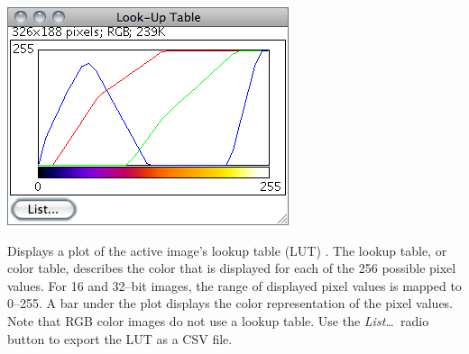 \begin{minipage}[c][1\totalheight][t]{0.438\columnwidth}%
\includegraphics[scale=0.55]{images/ShowLut}%
\end{minipage}%
\begin{minipage}[c][1\totalheight][t]{0.562\columnwidth}%
Displays a plot of the active image's lookup table (LUT) . The lookup
table, or color table, describes the color that is displayed for each
of the 256 possible pixel values. For 16 and 32--bit images, the range
of displayed pixel values is mapped to 0--255. A bar under the plot
displays the color representation of the pixel values. Note that RGB
color images do not use a lookup table. Use the\emph{ List\ldots{}\ }radio
button to export the LUT as a CSV
file.


%
\end{minipage}


\subsubsection{\protect{}\label{sub:Edit-LUT}}

